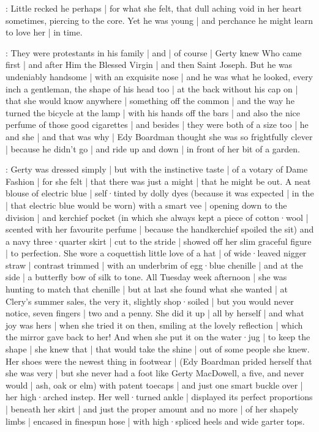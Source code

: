 \gertyNovel:
Little recked he perhaps |
for what she felt,
that dull aching void in her heart sometimes,
piercing to the core.
Yet he was young |
and perchance he might learn to love her |
in time.

\gertyReal:
They were protestants in his family |
and |
of course |
Gerty knew Who came first |
and after Him the Blessed Virgin |
and then Saint Joseph.%
But he was undeniably handsome |
with an exquisite nose |
and he was what he looked,
every inch a gentleman,
the shape of his head too |
at the back without his cap on |
that she would know anywhere |
something off the common |
and the way he turned the bicycle at the lamp |
with his hands off the bars |
and also the nice perfume of those good cigarettes |
and besides |
they were both of a size too |
he and she |
and that was why |
Edy Boardman thought she was so frightfully clever |
because he didn't go |
and ride up and down |
in front of her bit of a garden.

\gertyReal:
Gerty was dressed simply |
but with the instinctive taste |
of a votary of Dame Fashion |
for she felt |
that there was just a might |
that he might be out.
A neat blouse of electric blue |
self·tinted by dolly dyes
(because it was expected |
in the  |
that electric blue would be worn)
with a smart vee |
opening down to the division |
and kerchief pocket
(in which
she always kept a piece of cotton·wool |
scented with her favourite perfume |
because the handkerchief spoiled the sit)
and a navy three·quarter skirt |
cut to the stride |
showed off her slim graceful figure |
to perfection.
She wore a coquettish little love of a hat |
of wide·leaved nigger straw |
contrast trimmed |
with an underbrim of egg·blue chenille |
and at the side |
a butterfly bow of silk to tone.
All Tuesday week afternoon |
she was hunting to match that chenille |
but at last
she found what she wanted |
at Clery's summer sales,
the very it,
slightly shop·soiled |
but you would never notice,%
seven fingers |
two and a penny.
She did it up |
all by herself |
and what joy was hers |
when she tried it on then,
smiling at the lovely reflection |
which the mirror gave back to her!
And when she put it on the water·jug |
to keep the shape |
she knew that |
that would take the shine |
out of some people she knew.
Her shoes were the newest thing in footwear |
(Edy Boardman prided herself that she was very  |
but she never had a foot like Gerty MacDowell,
a five,
and never would |
ash, oak or elm)
with patent toecaps |
and just one smart buckle over |
her high·arched instep.
Her well·turned ankle |
displayed its perfect proportions |
beneath her skirt |
and just the proper amount and no more |
of her shapely limbs |
encased in finespun hose |%
with high·spliced heels and wide garter tops.

